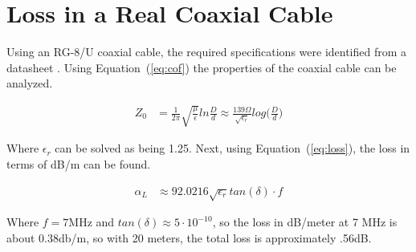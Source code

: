 \section{Loss in a Real Coaxial Cable}

Using an RG-8/U coaxial cable, the required specifications were 
identified from a datasheet \cite{coax}. Using Equation~(\ref{eq:cof}) \cite{cof}
the properties of the coaxial cable can be analyzed.

\begin{align}
Z_0&=\frac{1}{2\pi}\sqrt{\frac{\mu}{\epsilon}}ln\frac{D}{d}
\approx\frac{139\Omega}{\sqrt{\epsilon_r}}log\bigg(\frac{D}{d}\bigg)\label{eq:cof}
\end{align}

Where $\epsilon_r$ can be solved as being 1.25. Next, using
Equation~(\ref{eq:loss}), the loss in terms of dB/m can be found.

\begin{align}
  \alpha_L&\approx92.0216\sqrt{\epsilon_r}tan(\delta)\cdot f\label{eq:loss}
\end{align}

Where $f=7$MHz and $tan(\delta)\approx5\cdot10^{-10}$, so the loss in dB/meter at 7
  MHz is about 0.38db/m, so with 20 meters, the total loss is approximately
  .56dB.

